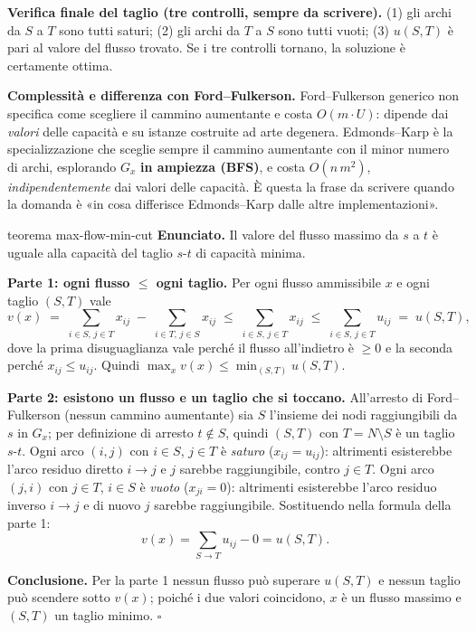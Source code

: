 \documentclass[11pt,a4paper]{article}
\begin{document}
\begin{idea}
\textbf{Verifica finale del taglio (tre controlli, sempre da scrivere).}
(1) gli archi da $S$ a $T$ sono tutti saturi; (2) gli archi da $T$ a $S$ sono tutti vuoti;
(3) $u(S,T)$ è pari al valore del flusso trovato.
Se i tre controlli tornano, la soluzione è certamente ottima.
\end{idea}

\textbf{Complessità e differenza con Ford--Fulkerson.}
Ford--Fulkerson generico non specifica come scegliere il cammino aumentante e costa
$O(m \cdot U)$: dipende dai \emph{valori} delle capacità e su istanze costruite ad arte
degenera. Edmonds--Karp è la specializzazione che sceglie sempre il cammino aumentante con
il minor numero di archi, esplorando $G_x$ \textbf{in ampiezza (BFS)}, e costa $O(n\,m^2)$,
\emph{indipendentemente} dai valori delle capacità. È questa la frase da scrivere quando
la domanda è «in cosa differisce Edmonds--Karp dalle altre implementazioni».

\newpage
\begin{teo}{teorema max-flow-min-cut}
\textbf{Enunciato.} Il valore del flusso massimo da $s$ a $t$ è uguale alla capacità
del taglio $s$-$t$ di capacità minima.

\textbf{Parte 1: ogni flusso $\le$ ogni taglio.}
Per ogni flusso ammissibile $x$ e ogni taglio $(S,T)$ vale
\[
v(x) \;=\; \sum_{i\in S,\,j\in T} x_{ij} \;-\; \sum_{i\in T,\,j\in S} x_{ij}
      \;\le\; \sum_{i\in S,\,j\in T} x_{ij}
      \;\le\; \sum_{i\in S,\,j\in T} u_{ij} \;=\; u(S,T),
\]
dove la prima disuguaglianza vale perché il flusso all'indietro è $\ge 0$ e la seconda
perché $x_{ij}\le u_{ij}$.
Quindi $\max_x v(x) \le \min_{(S,T)} u(S,T)$.

\textbf{Parte 2: esistono un flusso e un taglio che si toccano.}
All'arresto di Ford--Fulkerson (nessun cammino aumentante) sia
$S$ l'insieme dei nodi raggiungibili da $s$ in $G_x$; per definizione di arresto $t \notin S$,
quindi $(S,T)$ con $T = N\setminus S$ è un taglio $s$-$t$.
Ogni arco $(i,j)$ con $i\in S$, $j\in T$ è \emph{saturo} ($x_{ij} = u_{ij}$): altrimenti
esisterebbe l'arco residuo diretto $i\to j$ e $j$ sarebbe raggiungibile, contro $j\in T$.
Ogni arco $(j,i)$ con $j\in T$, $i\in S$ è \emph{vuoto} ($x_{ji} = 0$): altrimenti esisterebbe
l'arco residuo inverso $i\to j$ e di nuovo $j$ sarebbe raggiungibile.
Sostituendo nella formula della parte 1:
\[ v(x) = \sum_{S\to T} u_{ij} - 0 = u(S,T). \]

\textbf{Conclusione.} Per la parte 1 nessun flusso può superare $u(S,T)$ e nessun taglio può
scendere sotto $v(x)$; poiché i due valori coincidono, $x$ è un flusso massimo e $(S,T)$ un
taglio minimo. $\square$
\end{teo}
\end{document}
